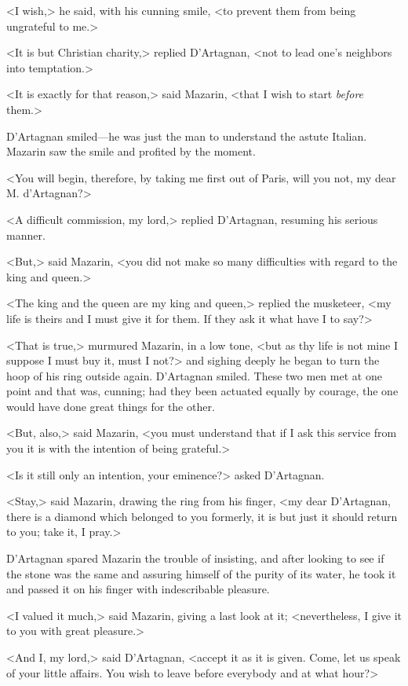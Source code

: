 <I wish,> he said, with his cunning smile, <to prevent them from being ungrateful to me.>

<It is but Christian charity,> replied D'Artagnan, <not to lead one's neighbors into temptation.>

<It is exactly for that reason,> said Mazarin, <that I wish to start \textit{before} them.>

D'Artagnan smiled—he was just the man to understand the astute Italian. Mazarin saw the smile and profited by the moment.

<You will begin, therefore, by taking me first out of Paris, will you not, my dear M. d'Artagnan?>

<A difficult commission, my lord,> replied D'Artagnan, resuming his serious manner.

<But,> said Mazarin, <you did not make so many difficulties with regard to the king and queen.>

<The king and the queen are my king and queen,> replied the musketeer, <my life is theirs and I must give it for them. If they ask it what have I to say?>

<That is true,> murmured Mazarin, in a low tone, <but as thy life is not mine I suppose I must buy it, must I not?> and sighing deeply he began to turn the hoop of his ring outside again. D'Artagnan smiled. These two men met at one point and that was, cunning; had they been actuated equally by courage, the one would have done great things for the other.

<But, also,> said Mazarin, <you must understand that if I ask this service from you it is with the intention of being grateful.>

<Is it still only an intention, your eminence?> asked D'Artagnan.

<Stay,> said Mazarin, drawing the ring from his finger, <my dear D'Artagnan, there is a diamond which belonged to you formerly, it is but just it should return to you; take it, I pray.>

D'Artagnan spared Mazarin the trouble of insisting, and after looking to see if the stone was the same and assuring himself of the purity of its water, he took it and passed it on his finger with indescribable pleasure.

<I valued it much,> said Mazarin, giving a last look at it; <nevertheless, I give it to you with great pleasure.>

<And I, my lord,> said D'Artagnan, <accept it as it is given. Come, let us speak of your little affairs. You wish to leave before everybody and at what hour?>

